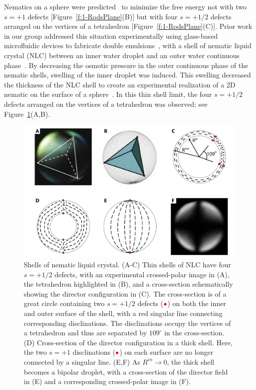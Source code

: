 Nematics on a sphere were predicted~\cite{RN42,RN104,RN43} to minimize the free energy not with two $s=+1$ defects [Figure~\ref{f:1-RodsPlane}(B)] but with four $s=+1/2$ defects arranged on the vertices of a tetrahedron [Figure~\ref{f:1-RodsPlane}(C)].
Prior work in our group addressed this situation experimentally using glass-based microfluidic devices to fabricate double emulsions~\cite{RN272}, with a shell of nematic liquid crystal (NLC) between an inner water droplet and an outer water continuous phase~\cite{RN105,RN45}.
By decreasing the osmotic pressure in the outer continuous phase of the nematic shells, swelling of the inner droplet was induced.
This swelling decreased the thickness of the NLC shell to create an experimental realization of a 2D nematic on the surface of a sphere~\cite{RN45}.
In this thin shell limit, the four $s = +1/2$ defects arranged on the vertices of a tetrahedron was observed; see Figure~\ref{f:1-Shells}(A,B).
\begin{figure}
  \centering
  \includegraphics{figures/C1/Ch1-Figs_Shells.png}
  \caption{Shells of nematic liquid crystal.
  (A-C) Thin shells of NLC have four $s = +1/2$ defects, with an experimental crossed-polar image in (A), the tetrahedron highlighted in (B), and a cross-section schematically showing the director configuration in (C).
  The cross-section is of a great circle containing two $s = +1/2$ defects (${\color{red} \bullet}$) on both the inner and outer surface of the shell, with a red singular line connecting corresponding disclinations.
  The disclinations occupy the vertices of a tetrahedron and thus are separated by $109^{\circ}$ in the cross-section.
  (D) Cross-section of the director configuration in a thick shell. Here, the two $s = +1$ disclinations (${\color{red} \bullet}$) on each surface are no longer connected by a singular line.
  (E,F) As $R^{in}\rightarrow 0$, the thick shell becomes a bipolar droplet, with a cross-section of the director field in (E) and a corresponding crossed-polar image in (F).}\label{f:1-Shells}
\end{figure}

